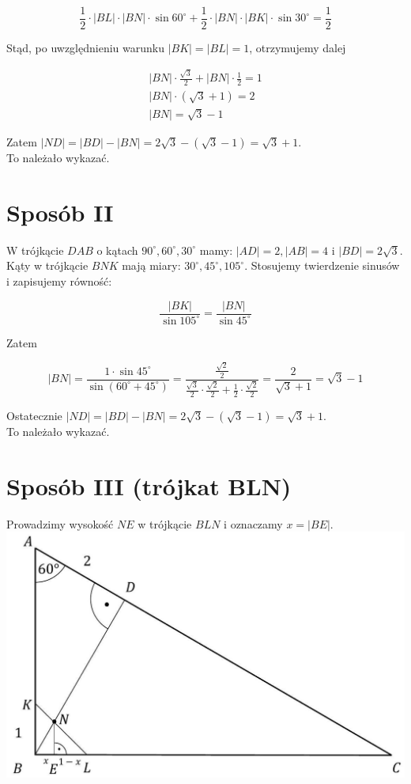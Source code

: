 \documentclass[10pt]{article}
\begin{document}
$$
\frac{1}{2} \cdot|B L| \cdot|B N| \cdot \sin 60^{\circ}+\frac{1}{2} \cdot|B N| \cdot|B K| \cdot \sin 30^{\circ}=\frac{1}{2}
$$

Stąd, po uwzględnieniu warunku $|B K|=|B L|=1$, otrzymujemy dalej

$$
\begin{gathered}
|B N| \cdot \frac{\sqrt{3}}{2}+|B N| \cdot \frac{1}{2}=1 \\
|B N| \cdot(\sqrt{3}+1)=2 \\
|B N|=\sqrt{3}-1
\end{gathered}
$$

Zatem $|N D|=|B D|-|B N|=2 \sqrt{3}-(\sqrt{3}-1)=\sqrt{3}+1$.\\
To należało wykazać.

\section*{Sposób II}
W trójkącie $D A B$ o kątach $90^{\circ}, 60^{\circ}, 30^{\circ}$ mamy: $|A D|=2,|A B|=4$ i $|B D|=2 \sqrt{3}$. Kąty w trójkącie $B N K$ mają miary: $30^{\circ}, 45^{\circ}, 105^{\circ}$. Stosujemy twierdzenie sinusów i zapisujemy równość:

$$
\frac{|B K|}{\sin 105^{\circ}}=\frac{|B N|}{\sin 45^{\circ}}
$$

Zatem

$$
|B N|=\frac{1 \cdot \sin 45^{\circ}}{\sin \left(60^{\circ}+45^{\circ}\right)}=\frac{\frac{\sqrt{2}}{2}}{\frac{\sqrt{3}}{2} \cdot \frac{\sqrt{2}}{2}+\frac{1}{2} \cdot \frac{\sqrt{2}}{2}}=\frac{2}{\sqrt{3}+1}=\sqrt{3}-1
$$

Ostatecznie $|N D|=|B D|-|B N|=2 \sqrt{3}-(\sqrt{3}-1)=\sqrt{3}+1$.\\
To należało wykazać.

\section*{Sposób III (trójkat BLN)}
Prowadzimy wysokość $N E$ w trójkącie $B L N$ i oznaczamy $x=|B E|$.\\
\includegraphics[max width=\textwidth, center]{2025_02_07_dcb3d059df06a3930b0ag-09}
\end{document}
